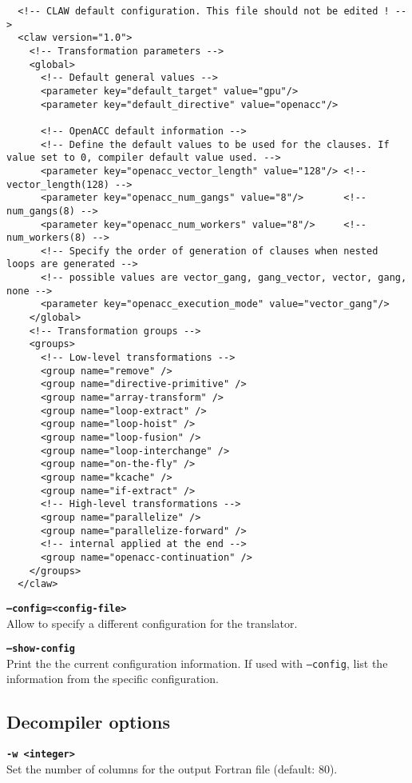 \documentclass{article}
\begin{document}
\begin{lstlisting}
  <!-- CLAW default configuration. This file should not be edited ! -->
  <claw version="1.0">
    <!-- Transformation parameters -->
    <global>
      <!-- Default general values -->
      <parameter key="default_target" value="gpu"/>
      <parameter key="default_directive" value="openacc"/>

      <!-- OpenACC default information -->
      <!-- Define the default values to be used for the clauses. If value set to 0, compiler default value used. -->
      <parameter key="openacc_vector_length" value="128"/> <!-- vector_length(128) -->
      <parameter key="openacc_num_gangs" value="8"/>       <!-- num_gangs(8) -->
      <parameter key="openacc_num_workers" value="8"/>     <!-- num_workers(8) -->
      <!-- Specify the order of generation of clauses when nested loops are generated -->
      <!-- possible values are vector_gang, gang_vector, vector, gang, none -->
      <parameter key="openacc_execution_mode" value="vector_gang"/>
    </global>
    <!-- Transformation groups -->
    <groups>
      <!-- Low-level transformations -->
      <group name="remove" />
      <group name="directive-primitive" />
      <group name="array-transform" />
      <group name="loop-extract" />
      <group name="loop-hoist" />
      <group name="loop-fusion" />
      <group name="loop-interchange" />
      <group name="on-the-fly" />
      <group name="kcache" />
      <group name="if-extract" />
      <!-- High-level transformations -->
      <group name="parallelize" />
      <group name="parallelize-forward" />
      <!-- internal applied at the end -->
      <group name="openacc-continuation" />
    </groups>
  </claw>
\end{lstlisting}

\textbf{\texttt{--config=<config-file>}}\\
Allow to specify a different configuration for the translator.

\textbf{\texttt{--show-config}}\\
Print the the current configuration information. If used with \texttt{--config}, list the information from the specific configuration.

\subsection{Decompiler options}
\textbf{\texttt{-w <integer>}}\\
Set the number of columns for the output Fortran file (default: 80).
\end{document}
